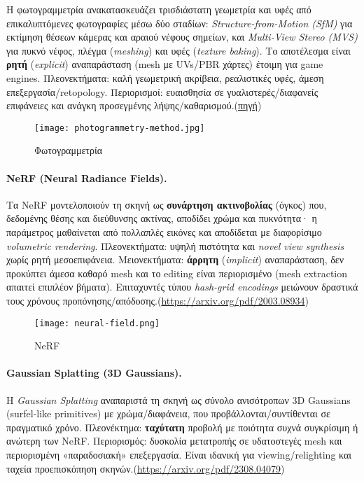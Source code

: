 Η φωτογραμμετρία ανακατασκευάζει τρισδιάστατη γεωμετρία και υφές από επικαλυπτόμενες φωτογραφίες μέσω δύο σταδίων: \emph{Structure-from-Motion (SfM)} για εκτίμηση θέσεων κάμερας και αραιού νέφους σημείων, και \emph{Multi-View Stereo (MVS)} για πυκνό νέφος, πλέγμα (\emph{meshing}) και υφές (\emph{texture baking}). Το αποτέλεσμα είναι \textbf{ρητή} (\emph{explicit}) αναπαράσταση (mesh με UVs/PBR χάρτες) έτοιμη για game engines. Πλεονεκτήματα: καλή γεωμετρική ακρίβεια, ρεαλιστικές υφές, άμεση επεξεργασία/retopology. Περιορισμοί: ευαισθησία σε γυαλιστερές/διαφανείς επιφάνειες και ανάγκη προσεγμένης λήψης/καθαρισμού.(\href{https://library.huree.edu.mn/data/202295/2024-06-03/Computer%20Vision%20-%20Algorithms%20and%20Applications%202nd%20Edition%2C%20Richard%20Szeliski.pdf}{πηγή})

\begin{figure}[H]
    \centering
    \texttt{[image: photogrammetry-method.jpg]}
    \caption{Φωτογραμμετρία}
    \label{fig:placeholder}
\end{figure}
\paragraph{NeRF (Neural Radiance Fields).}
Τα NeRF μοντελοποιούν τη σκηνή ως \textbf{συνάρτηση ακτινοβολίας} (όγκος) που, δεδομένης θέσης και διεύθυνσης ακτίνας, αποδίδει χρώμα και πυκνότητα· η παράμετρος μαθαίνεται από πολλαπλές εικόνες και αποδίδεται με διαφορίσιμο \emph{volumetric rendering}. Πλεονεκτήματα: υψηλή πιστότητα και \emph{novel view synthesis} χωρίς ρητή μεσοεπιφάνεια. Μειονεκτήματα: \textbf{άρρητη} (\emph{implicit}) αναπαράσταση, δεν προκύπτει άμεσα καθαρό mesh και το editing είναι περιορισμένο (mesh extraction απαιτεί επιπλέον βήματα). Επιταχυντές τύπου \emph{hash-grid encodings} μειώνουν δραστικά τους χρόνους προπόνησης/απόδοσης.(\href{https://arxiv.org/pdf/2003.08934}{https://arxiv.org/pdf/2003.08934})

\begin{figure}[H]
    \centering
    \texttt{[image: neural-field.png]}
    \caption{NeRF}
    \label{fig:placeholder}
\end{figure}

\paragraph{Gaussian Splatting (3D Gaussians).}
Η \emph{Gaussian Splatting} αναπαριστά τη σκηνή ως σύνολο ανισότροπων 3D Gaussians (surfel-like primitives) με χρώμα/διαφάνεια, που προβάλλονται/συντίθενται σε πραγματικό χρόνο. Πλεονέκτημα: \textbf{ταχύτατη} προβολή με ποιότητα συχνά συγκρίσιμη ή ανώτερη των NeRF. Περιορισμός: δυσκολία μετατροπής σε υδατοστεγές mesh και περιορισμένη «παραδοσιακή» επεξεργασία. Είναι ιδανική για viewing/relighting και ταχεία προεπισκόπηση σκηνών.(\href{https://arxiv.org/pdf/2308.04079}{https://arxiv.org/pdf/2308.04079})

